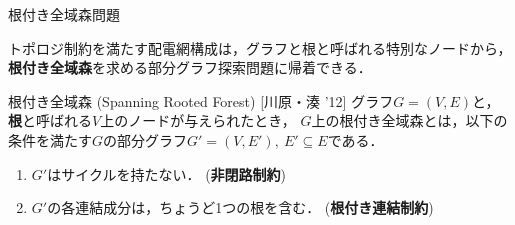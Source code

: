 \begin{frame}{根付き全域森問題}
 \begin{alertblock}{}
  トポロジ制約を満たす配電網構成は，グラフと根と呼ばれる特別なノードから，
  \alert{\bf 根付き全域森}を求める部分グラフ探索問題に帰着できる．
 \end{alertblock}
 \vfill
 \begin{block}{根付き全域森 (Spanning Rooted Forest) [川原・湊 '12]}
  グラフ$G=(V,E)$と，
  \textbf{根}と呼ばれる$V$上のノードが与えられたとき，
  $G$上の根付き全域森とは，以下の条件を満たす$G$の部分グラフ$G'=(V,E'),\ E' \subseteq E$である．
  \begin{enumerate}
   \item $G'$はサイクルを持たない． (\alert{\bf 非閉路制約})
   \item $G'$の各連結成分は，ちょうど1つの根を含む． (\alert{\bf 根付き連結制約})
  \end{enumerate}
 \end{block}
\end{frame}
